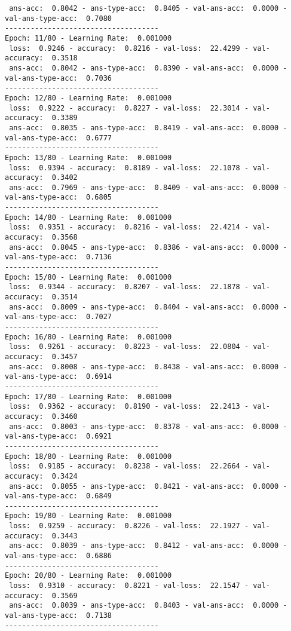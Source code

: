\documentclass{report}
\begin{document}
\begin{verbatim}
 ans-acc:  0.8042 - ans-type-acc:  0.8405 - val-ans-acc:  0.0000 - val-ans-type-acc:  0.7080
------------------------------------
Epoch: 11/80 - Learning Rate:  0.001000
 loss:  0.9246 - accuracy:  0.8216 - val-loss:  22.4299 - val-accuracy:  0.3518
 ans-acc:  0.8042 - ans-type-acc:  0.8390 - val-ans-acc:  0.0000 - val-ans-type-acc:  0.7036
------------------------------------
Epoch: 12/80 - Learning Rate:  0.001000
 loss:  0.9222 - accuracy:  0.8227 - val-loss:  22.3014 - val-accuracy:  0.3389
 ans-acc:  0.8035 - ans-type-acc:  0.8419 - val-ans-acc:  0.0000 - val-ans-type-acc:  0.6777
------------------------------------
Epoch: 13/80 - Learning Rate:  0.001000
 loss:  0.9394 - accuracy:  0.8189 - val-loss:  22.1078 - val-accuracy:  0.3402
 ans-acc:  0.7969 - ans-type-acc:  0.8409 - val-ans-acc:  0.0000 - val-ans-type-acc:  0.6805
------------------------------------
Epoch: 14/80 - Learning Rate:  0.001000
 loss:  0.9351 - accuracy:  0.8216 - val-loss:  22.4214 - val-accuracy:  0.3568
 ans-acc:  0.8045 - ans-type-acc:  0.8386 - val-ans-acc:  0.0000 - val-ans-type-acc:  0.7136
------------------------------------
Epoch: 15/80 - Learning Rate:  0.001000
 loss:  0.9344 - accuracy:  0.8207 - val-loss:  22.1878 - val-accuracy:  0.3514
 ans-acc:  0.8009 - ans-type-acc:  0.8404 - val-ans-acc:  0.0000 - val-ans-type-acc:  0.7027
------------------------------------
Epoch: 16/80 - Learning Rate:  0.001000
 loss:  0.9261 - accuracy:  0.8223 - val-loss:  22.0804 - val-accuracy:  0.3457
 ans-acc:  0.8008 - ans-type-acc:  0.8438 - val-ans-acc:  0.0000 - val-ans-type-acc:  0.6914
------------------------------------
Epoch: 17/80 - Learning Rate:  0.001000
 loss:  0.9362 - accuracy:  0.8190 - val-loss:  22.2413 - val-accuracy:  0.3460
 ans-acc:  0.8003 - ans-type-acc:  0.8378 - val-ans-acc:  0.0000 - val-ans-type-acc:  0.6921
------------------------------------
Epoch: 18/80 - Learning Rate:  0.001000
 loss:  0.9185 - accuracy:  0.8238 - val-loss:  22.2664 - val-accuracy:  0.3424
 ans-acc:  0.8055 - ans-type-acc:  0.8421 - val-ans-acc:  0.0000 - val-ans-type-acc:  0.6849
------------------------------------
Epoch: 19/80 - Learning Rate:  0.001000
 loss:  0.9259 - accuracy:  0.8226 - val-loss:  22.1927 - val-accuracy:  0.3443
 ans-acc:  0.8039 - ans-type-acc:  0.8412 - val-ans-acc:  0.0000 - val-ans-type-acc:  0.6886
------------------------------------
Epoch: 20/80 - Learning Rate:  0.001000
 loss:  0.9310 - accuracy:  0.8221 - val-loss:  22.1547 - val-accuracy:  0.3569
 ans-acc:  0.8039 - ans-type-acc:  0.8403 - val-ans-acc:  0.0000 - val-ans-type-acc:  0.7138
------------------------------------

\end{verbatim}
\end{document}
